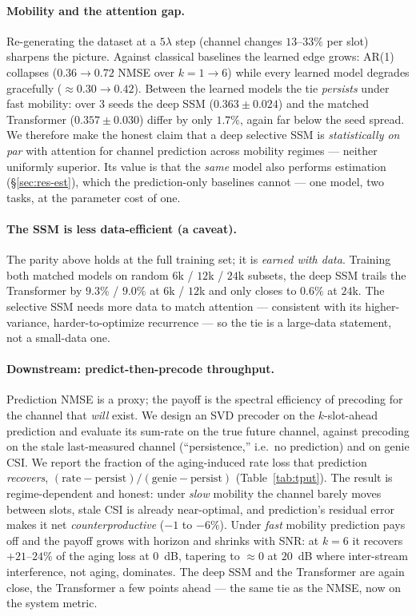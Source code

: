 \documentclass[11pt]{article}
\begin{document}
\paragraph{Mobility and the attention gap.} Re-generating the dataset at a $5\lambda$ step (channel
changes $13$--$33\%$ per slot) sharpens the picture. Against classical baselines the learned edge
grows: AR(1) collapses ($0.36\!\to\!0.72$ NMSE over $k{=}1\!\to\!6$) while every learned model degrades
gracefully ($\approx\!0.30\!\to\!0.42$). Between the learned models the tie \emph{persists} under fast
mobility: over $3$ seeds the deep SSM ($0.363\!\pm\!0.024$) and the matched Transformer
($0.357\!\pm\!0.030$) differ by only $1.7\%$, again far below the seed spread. We therefore make the
honest claim that a deep selective SSM is \emph{statistically on par} with attention for channel
prediction across mobility regimes --- neither uniformly superior. Its value is that the \emph{same}
model also performs estimation (\S\ref{sec:res-est}), which the prediction-only baselines cannot ---
one model, two tasks, at the parameter cost of one.

\paragraph{The SSM is less data-efficient (a caveat).} The parity above holds at the full training set;
it is \emph{earned with data}. Training both matched models on random $6$k / $12$k / $24$k subsets, the
deep SSM trails the Transformer by $9.3\%$ / $9.0\%$ at $6$k / $12$k and only closes to $0.6\%$ at $24$k.
The selective SSM needs more data to match attention --- consistent with its higher-variance,
harder-to-optimize recurrence --- so the tie is a large-data statement, not a small-data one.

\paragraph{Downstream: predict-then-precode throughput.} Prediction NMSE is a proxy; the payoff is the
spectral efficiency of precoding for the channel that \emph{will} exist. We design an SVD precoder on
the $k$-slot-ahead prediction and evaluate its sum-rate on the true future channel, against precoding
on the stale last-measured channel (``persistence,'' i.e.\ no prediction) and on genie CSI. We report
the fraction of the aging-induced rate loss that prediction \emph{recovers},
$(\text{rate}-\text{persist})/(\text{genie}-\text{persist})$ (Table~\ref{tab:tput}). The result is
regime-dependent and honest: under \emph{slow} mobility the channel barely moves between slots, stale
CSI is already near-optimal, and prediction's residual error makes it net \emph{counterproductive}
($-1$ to $-6\%$). Under \emph{fast} mobility prediction pays off and the payoff grows with horizon and
shrinks with SNR: at $k{=}6$ it recovers $+21$--$24\%$ of the aging loss at $0$~dB, tapering to
$\approx\!0$ at $20$~dB where inter-stream interference, not aging, dominates. The deep SSM and the
Transformer are again close, the Transformer a few points ahead --- the same tie as the NMSE, now on
the system metric.
\end{document}
